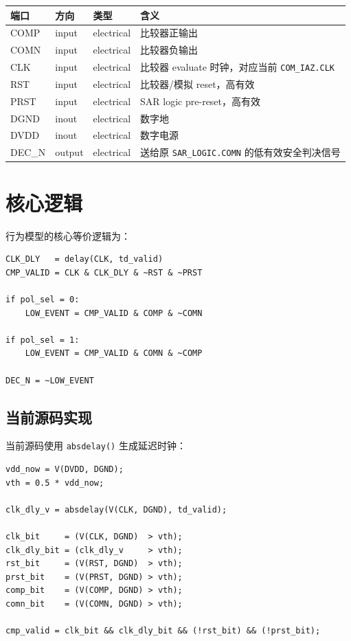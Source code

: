 \documentclass[11pt,a4paper,UTF8]{ctexart}
\begin{document}
\begin{center}
\begin{tabularx}{\textwidth}{>{\ttfamily}l l l X}
\toprule
\textbf{端口} & \textbf{方向} & \textbf{类型} & \textbf{含义} \\
\midrule
COMP & input & electrical & 比较器正输出 \\
COMN & input & electrical & 比较器负输出 \\
CLK & input & electrical & 比较器 evaluate 时钟，对应当前 \texttt{COM\_IAZ.CLK} \\
RST & input & electrical & 比较器/模拟 reset，高有效 \\
PRST & input & electrical & SAR logic pre-reset，高有效 \\
DGND & inout & electrical & 数字地 \\
DVDD & inout & electrical & 数字电源 \\
DEC\_N & output & electrical & 送给原 \texttt{SAR\_LOGIC.COMN} 的低有效安全判决信号 \\
\bottomrule
\end{tabularx}
\end{center}

\section{核心逻辑}

行为模型的核心等价逻辑为：

\begin{lstlisting}[style=va,numbers=none]
CLK_DLY   = delay(CLK, td_valid)
CMP_VALID = CLK & CLK_DLY & ~RST & ~PRST

if pol_sel = 0:
    LOW_EVENT = CMP_VALID & COMP & ~COMN

if pol_sel = 1:
    LOW_EVENT = CMP_VALID & COMN & ~COMP

DEC_N = ~LOW_EVENT
\end{lstlisting}

\subsection{当前源码实现}

当前源码使用 \texttt{absdelay()} 生成延迟时钟：

\begin{lstlisting}[style=va]
vdd_now = V(DVDD, DGND);
vth = 0.5 * vdd_now;

clk_dly_v = absdelay(V(CLK, DGND), td_valid);

clk_bit     = (V(CLK, DGND)  > vth);
clk_dly_bit = (clk_dly_v     > vth);
rst_bit     = (V(RST, DGND)  > vth);
prst_bit    = (V(PRST, DGND) > vth);
comp_bit    = (V(COMP, DGND) > vth);
comn_bit    = (V(COMN, DGND) > vth);

cmp_valid = clk_bit && clk_dly_bit && (!rst_bit) && (!prst_bit);
\end{lstlisting}
\end{document}
